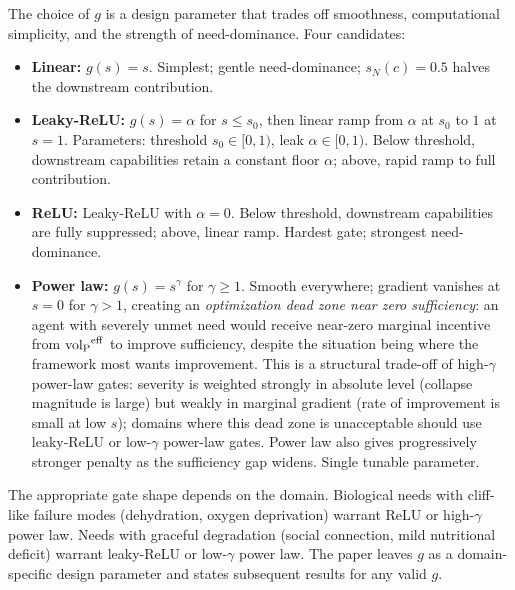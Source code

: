 \begin{remark}
\label{rem:gate_candidates}
The choice of $g$ is a design parameter that trades off
smoothness, computational simplicity, and the strength of
need-dominance.  Four candidates:
\begin{itemize}
\item \textbf{Linear:} $g(s) = s$.  Simplest; gentle
  need-dominance; $s_N(c) = 0.5$ halves the downstream
  contribution.
\item \textbf{Leaky-ReLU:} $g(s) = \alpha$ for $s \leq s_0$,
  then linear ramp from $\alpha$ at $s_0$ to $1$ at $s = 1$.
  Parameters: threshold $s_0 \in [0, 1)$, leak $\alpha \in [0, 1)$.
  Below threshold, downstream capabilities retain a constant
  floor $\alpha$; above, rapid ramp to full contribution.
\item \textbf{ReLU:} Leaky-ReLU with $\alpha = 0$.  Below
  threshold, downstream capabilities are fully suppressed; above,
  linear ramp.  Hardest gate; strongest need-dominance.
\item \textbf{Power law:} $g(s) = s^\gamma$ for $\gamma \geq 1$.
  Smooth everywhere; gradient vanishes at $s = 0$ for $\gamma > 1$,
  creating an \emph{optimization dead zone near zero
  sufficiency}: an agent with severely unmet need would receive
  near-zero marginal incentive from ${\operatorname{vol}_{\mathrm{P}}}^{\mathrm{eff}}$ to
  improve sufficiency, despite the situation being where the
  framework most wants improvement.  This is a structural
  trade-off of high-$\gamma$ power-law gates: severity is
  weighted strongly in absolute level (collapse magnitude is
  large) but weakly in marginal gradient (rate of improvement
  is small at low $s$); domains where this dead zone is
  unacceptable should use leaky-ReLU or low-$\gamma$ power-law
  gates.  Power law also gives progressively stronger penalty
  as the sufficiency gap
  widens.  Single tunable parameter.
\end{itemize}
The appropriate gate shape depends on the domain.  Biological
needs with cliff-like failure modes (dehydration, oxygen
deprivation) warrant ReLU or high-$\gamma$ power law.  Needs with
graceful degradation (social connection, mild nutritional
deficit) warrant leaky-ReLU or low-$\gamma$ power law.  The paper
leaves $g$ as a domain-specific design parameter and states
subsequent results for any valid $g$.
\end{remark}

